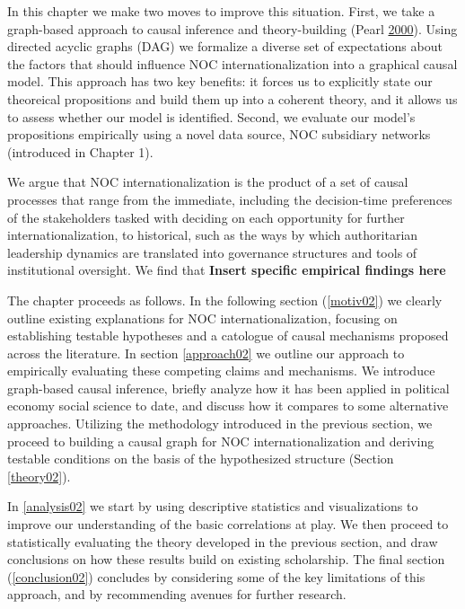 \documentclass[11pt,]{book}
\begin{document}
In this chapter we make two moves to improve this situation. First, we take a graph-based approach to causal inference and theory-building (Pearl \protect\hyperlink{ref-pearl_causality_2000}{2000}). Using directed acyclic graphs (DAG) we formalize a diverse set of expectations about the factors that should influence NOC internationalization into a graphical causal model. This approach has two key benefits: it forces us to explicitly state our theoreical propositions and build them up into a coherent theory, and it allows us to assess whether our model is identified. Second, we evaluate our model's propositions empirically using a novel data source, NOC subsidiary networks (introduced in Chapter 1).

We argue that NOC internationalization is the product of a set of causal processes that range from the immediate, including the decision-time preferences of the stakeholders tasked with deciding on each opportunity for further internationalization, to historical, such as the ways by which authoritarian leadership dynamics are translated into governance structures and tools of institutional oversight. We find that \textbf{Insert specific empirical findings here}

The chapter proceeds as follows. In the following section (\ref{motiv02}) we clearly outline existing explanations for NOC internationalization, focusing on establishing testable hypotheses and a catologue of causal mechanisms proposed across the literature. In section \ref{approach02} we outline our approach to empirically evaluating these competing claims and mechanisms. We introduce graph-based causal inference, briefly analyze how it has been applied in political economy social science to date, and discuss how it compares to some alternative approaches. Utilizing the methodology introduced in the previous section, we proceed to building a causal graph for NOC internationalization and deriving testable conditions on the basis of the hypothesized structure (Section \ref{theory02}).

In \ref{analysis02} we start by using descriptive statistics and visualizations to improve our understanding of the basic correlations at play. We then proceed to statistically evaluating the theory developed in the previous section, and draw conclusions on how these results build on existing scholarship. The final section (\ref{conclusion02}) concludes by considering some of the key limitations of this approach, and by recommending avenues for further research.
\end{document}
